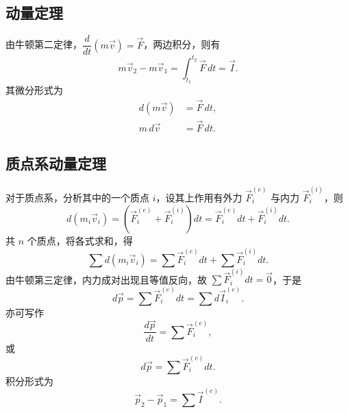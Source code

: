 \subsection{动量定理}

由牛顿第二定律，$\dfrac{d}{dt}\left(m\vec{v}\right)=\vec{F}$，两边积分，则有
\begin{equation}\label{eq:11-momentum-theorem-integral}
  m\vec{v}_2-m\vec{v}_1=\int_{t_1}^{t_2}\vec{F}\,dt=\vec{I}.
\end{equation}
其微分形式为
\begin{equation}\label{eq:11-momentum-theorem-diff}
\begin{aligned}
  d\left(m\vec{v}\right)&=\vec{F}\,dt,\\
  m\,d\vec{v}&=\vec{F}\,dt.
\end{aligned}
\end{equation}

\subsection{质点系动量定理}

对于质点系，分析其中的一个质点 $i$，设其上作用有外力 $\vec{F}_i^{(e)}$ 与内力 $\vec{F}_i^{(i)}$，则
\begin{equation}\label{eq:11-sys-particle}
  d\left(m_i\vec{v}_i\right)
    =\left(\vec{F}_i^{(e)}+\vec{F}_i^{(i)}\right)dt
    =\vec{F}_i^{(e)}dt+\vec{F}_i^{(i)}dt.
\end{equation}
共 $n$ 个质点，将各式求和，得
\begin{equation}\label{eq:11-sys-sum}
  \sum d\left(m_i\vec{v}_i\right)=\sum\vec{F}_i^{(e)}dt+\sum\vec{F}_i^{(i)}dt.
\end{equation}
由牛顿第三定律，内力成对出现且等值反向，故 $\sum\vec{F}_i^{(i)}dt=\vec{0}$，于是
\begin{equation}\label{eq:11-sys-dp}
  d\vec{p}=\sum\vec{F}_i^{(e)}dt=\sum d\vec{I}_i^{(e)}.
\end{equation}
亦可写作
\begin{equation}\label{eq:11-sys-rate}
  \frac{d\vec{p}}{dt}=\sum\vec{F}_i^{(e)},
\end{equation}
或
\begin{equation}\label{eq:11-sys-diff}
  d\vec{p}=\sum\vec{F}_i^{(e)}dt.
\end{equation}
积分形式为
\begin{equation}\label{eq:11-sys-integral}
  \vec{p}_2-\vec{p}_1=\sum\vec{I}^{(e)}.
\end{equation}

